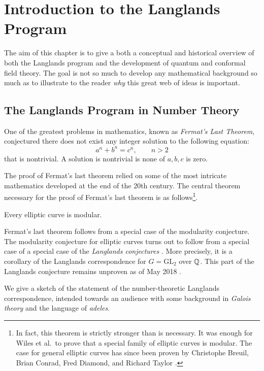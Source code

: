 \chapter{Introduction to the Langlands Program\label{ch:intro}}

The aim of this chapter is to give a both a conceptual and historical overview of both the Langlands program and the development of quantum and conformal field theory. The goal is not so much to develop any mathematical background so much as to illustrate to the reader \emph{why} this great web of ideas is important.

\section{The Langlands Program in Number Theory} %
\label{sec:the_langlands_program_in_number_theory}

One of the greatest problems in mathematics, known as \emph{Fermat's Last Theorem}, conjectured there does not exist any integer solution to the following equation:
$$a^n + b^n = c^n, \qquad n > 2$$
that is nontrivial. A solution is nontrivial is none of $a, b, c$ is zero.

The proof of Fermat's last theorem relied on some of the most intricate mathematics developed at the end of the 20th century. The central theorem necessary for the proof of Fermat's last theorem is as follows\footnote{In fact, this theorem is strictly stronger than is necessary. It was enough for Wiles et al.\ to prove that a special family of elliptic curves is modular. The case for general elliptic curves has since been proven by Christophe Breuil, Brian Conrad, Fred Diamond, and Richard
Taylor \cite{Yoo18}.}.
\begin{theorem}
	Every elliptic curve is modular.
\end{theorem}

Fermat's last theorem follows from a special case of the modularity conjecture. The modularity conjecture for elliptic curves turns out to follow from a special case of a special case of the \emph{Langlands conjectures} \cite{Langlands1970}.
More precisely, it is a corollary of the Langlands correspondence for $G = \mathrm{GL}_2$ over $\mathbb{Q}$. This part of the Langlands conjecture remains unproven as of May 2018 \cite{Yoo18}. 

We give a sketch of the statement of the number-theoretic Langlands correspondence, intended towards an audience with some background in \emph{Galois theory} and the language of \emph{adeles}. 

